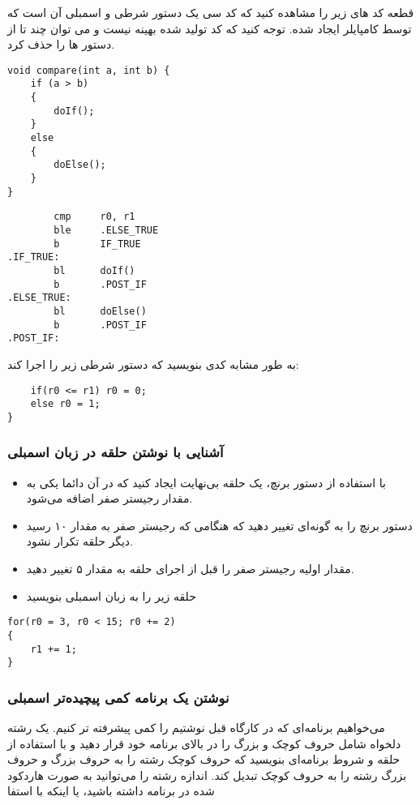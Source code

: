 \pagebreak

قطعه کد های زیر را مشاهده کنید که کد سی یک دستور شرطی و اسمبلی آن است که توسط کامپایلر ایجاد شده. توجه کنید که کد تولید شده بهینه نیست و می توان چند تا از دستور ها را حذف کرد.
\begin{latin}
\begin{lstlisting}
void compare(int a, int b) {
    if (a > b)
    {
        doIf();
    }
    else
    {
        doElse();
    }
}
\end{lstlisting}
\end{latin}

\begin{latin}
\begin{lstlisting}
        cmp     r0, r1
        ble     .ELSE_TRUE
        b       IF_TRUE
.IF_TRUE:
        bl      doIf()
        b       .POST_IF
.ELSE_TRUE:
        bl      doElse()
        b       .POST_IF
.POST_IF:
\end{lstlisting}
\end{latin}

به طور مشابه کدی بنویسید که دستور شرطی زیر را اجرا کند:
\begin{latin}
\begin{lstlisting}
    if(r0 <= r1) r0 = 0;
    else r0 = 1;
}
\end{lstlisting}
\end{latin}

\subsubsection{آشنایی با نوشتن حلقه در زبان اسمبلی}

\begin{itemize}
    \item با استفاده از دستور برنچ، یک حلقه بی‌نهایت ایجاد کنید که در آن دائما یکی به مقدار رجیستر صفر اضافه می‌شود.
    \item دستور برنچ را به گونه‌ای تغییر دهید که هنگامی که رجیستر صفر به مقدار ۱۰ رسید دیگر حلقه تکرار نشود.
    \item مقدار اولیه رجیستر صفر را قبل از اجرای حلقه به مقدار ۵ تغییر دهید.
    \item حلقه زیر را به زبان اسمبلی بنویسید
\end{itemize}

\begin{latin}
\begin{lstlisting}
for(r0 = 3, r0 < 15; r0 += 2)
{
    r1 += 1;
}
\end{lstlisting}
\end{latin}

\subsubsection{نوشتن یک برنامه کمی پیچیده‌تر اسمبلی}

می‌خواهیم برنامه‌ای که در کارگاه قبل نوشتیم را کمی پیشرفته تر کنیم. یک رشته دلخواه شامل حروف کوچک و بزرگ را در بالای برنامه خود قرار دهید و با استفاده از حلقه و شروط برنامه‌ای بنویسید که حروف کوچک رشته را به حروف بزرگ و حروف بزرگ رشته را به حروف کوچک تبدیل کند. اندازه رشته را می‌توانید به صورت هاردکود شده در برنامه داشته باشید، یا اینکه با استفا